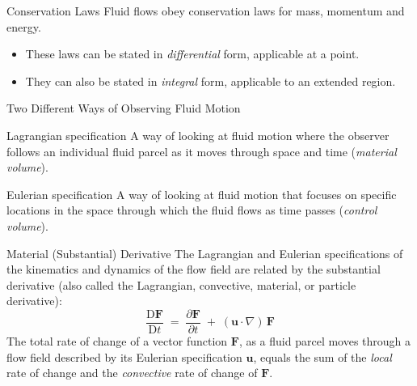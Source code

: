 \documentclass[10pt,aspectratio=43]{beamer}
\newcommand{\D}{\mathrm{D}}
\newcommand{\pd}[2]{\frac{\partial #1}{\partial #2}}
\newcommand{\bu}{\mathbf{u}}
\newcommand{\bF}{\mathbf{F}}
\begin{document}
\begin{frame}{Conservation Laws}
  Fluid flows obey conservation laws for \alert{mass}, \alert{momentum} and
  \alert{energy}.
  \begin{itemize}
    \item These laws can be stated in \emph{differential} form, applicable at
          a point.
    \item They can also be stated in \emph{integral} form, applicable to an
          extended region.
  \end{itemize}
\end{frame}

\begin{frame}{Two Different Ways of Observing Fluid Motion}
  \begin{block}{Lagrangian specification}
    A way of looking at fluid motion where the observer follows an individual
    fluid parcel as it moves through space and time (\emph{material volume}).
  \end{block}
  \begin{block}{Eulerian specification}
    A way of looking at fluid motion that focuses on specific locations in
    the space through which the fluid flows as time passes (\emph{control
    volume}).
  \end{block}
\end{frame}

\begin{frame}{Material (Substantial) Derivative}
  The Lagrangian and Eulerian specifications of the kinematics and dynamics
  of the flow field are related by the \alert{substantial derivative} (also
  called the Lagrangian, convective, material, or particle derivative):
  \[
    \boxed{\;\frac{\D \bF}{\D t} \;=\; \pd{\bF}{t} \;+\; (\bu\!\cdot\!\nabla)\,\bF\;}
  \]
  The total rate of change of a vector function $\bF$, as a fluid parcel
  moves through a flow field described by its Eulerian specification $\bu$,
  equals the sum of the \emph{local} rate of change and the \emph{convective}
  rate of change of $\bF$.
\end{frame}
\end{document}
